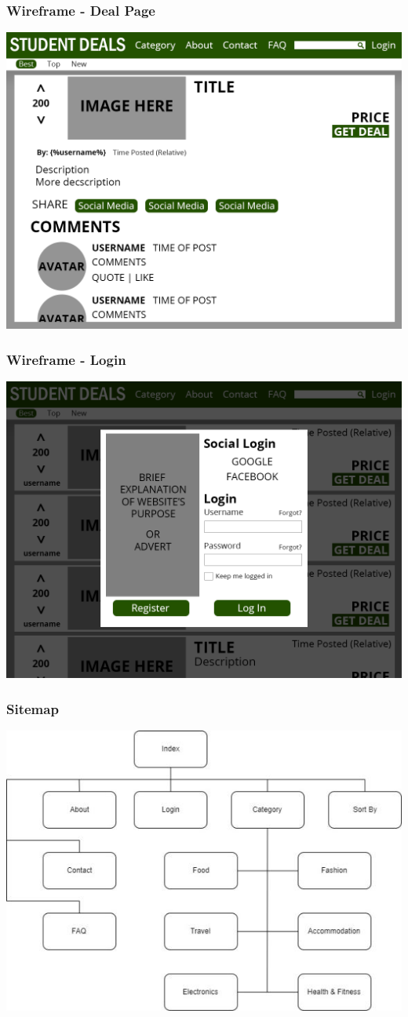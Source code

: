 \documentclass{beamer}
\begin{document}
\begin{frame}
	\frametitle{Wireframe - Deal Page}
	\includegraphics[width=\textwidth,height=\textheight,keepaspectratio]{mockups/deal-page}
\end{frame}

\begin{frame}
	\frametitle{Wireframe - Login}
	\includegraphics[width=\textwidth,height=\textheight,keepaspectratio]{mockups/login}
\end{frame}
	
\begin{frame}
	\frametitle{Sitemap}
	\includegraphics[width=\textwidth,height=\textheight,keepaspectratio]{site-map.jpg}
\end{frame}
\end{document}
